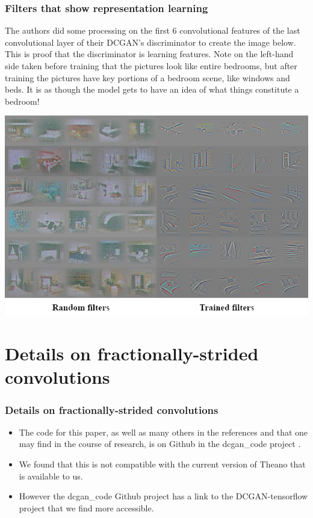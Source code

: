 \documentclass{beamer}
\begin{document}
\begin{frame}
\frametitle{Filters that show representation learning}
\begin{tiny}
The authors did some processing on the first 6 convolutional features of the
last convolutional layer of their DCGAN's discriminator to create the image below.  
This is proof that the discriminator  is learning features.  Note on the
left-hand side taken before training that the pictures look like entire bedrooms,
but after training the pictures have key portions of a bedroom scene, like windows
and beds.  It is as though the model gets to have an idea of what things constitute
a bedroom!
\end{tiny}
\includegraphics[scale=0.35] {feature-maps}
\end{frame}

\section{Details on fractionally-strided convolutions}
\begin{frame}
\frametitle{Details on fractionally-strided convolutions}
\begin{itemize}
\item The code for this paper, as well as many others in the references and
that one may find in the course of research, is on Github in the dcgan\_code
project \cite{dcganCode}.

\item We found that this is not compatible with the current version of Theano that
  is available to us.  
\item However the dcgan\_code Github project has a link
to the DCGAN-tensorflow \cite{dcganTf} project that we find more accessible.
\end{itemize}
\end{frame}
\end{document}
